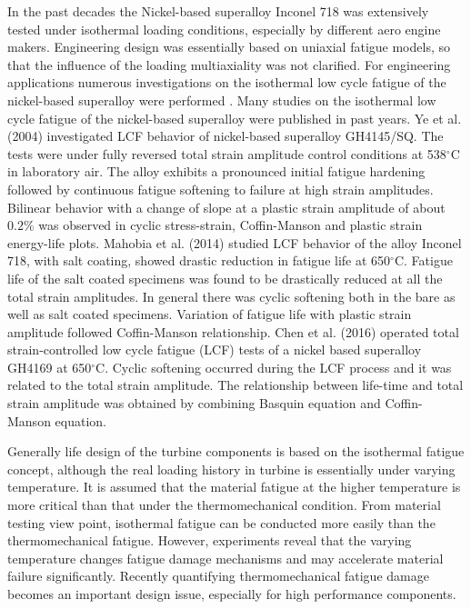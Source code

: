 In the past decades the Nickel-based superalloy Inconel 718 was extensively tested under isothermal loading conditions, especially by different aero engine makers. Engineering design was essentially based on uniaxial fatigue models, so that the influence of the loading multiaxiality was not clarified.
For engineering applications numerous investigations on the isothermal low cycle fatigue of the nickel-based superalloy were performed \cite{Koch85, Morrow88, Mahobia2014, Chen2016175, William1995, kim1988elevated, nelson1992creep}.
Many studies on the isothermal low cycle fatigue of the nickel-based superalloy were published in past years.
Ye et al. (2004) \cite{ye2004low} investigated LCF behavior of nickel-based superalloy GH4145/SQ. The tests were under fully reversed total strain amplitude control conditions at 538$^{\circ}$C in laboratory air. The alloy exhibits a pronounced initial fatigue hardening followed by continuous fatigue softening to failure at high strain amplitudes. Bilinear behavior with a change of slope at a plastic strain amplitude of about $0.2\%$ was observed in cyclic stress-strain, Coffin-Manson and plastic strain energy-life plots.
Mahobia et al. (2014) \cite{mahobia2014effect} studied LCF behavior of the alloy Inconel 718, with salt coating, showed drastic reduction in fatigue life at 650$^{\circ}$C. Fatigue life of the salt coated specimens was found to be drastically reduced at all the total strain amplitudes. In general there was cyclic softening both in the bare as well as salt coated specimens. Variation of fatigue life with plastic strain amplitude followed Coffin-Manson relationship.
Chen et al. (2016) \cite{Chen2016175} operated total strain-controlled low cycle fatigue (LCF) tests of a nickel based superalloy GH4169 at 650$^{\circ}$C. Cyclic softening occurred during the LCF process and it was related to the total strain amplitude. The relationship between life-time and total strain amplitude was obtained by combining Basquin equation and Coffin-Manson equation.

Generally life design of the turbine components is based on the isothermal fatigue concept, although the real loading history in turbine is essentially under varying temperature. It is assumed that the material fatigue at the higher temperature is more critical than that under the thermomechanical condition. From material testing view point, isothermal fatigue can be conducted more easily than the thermomechanical fatigue. However, experiments reveal that the varying temperature changes fatigue damage mechanisms and may accelerate material failure significantly. Recently quantifying thermomechanical fatigue damage becomes an important design issue, especially for high performance components.

